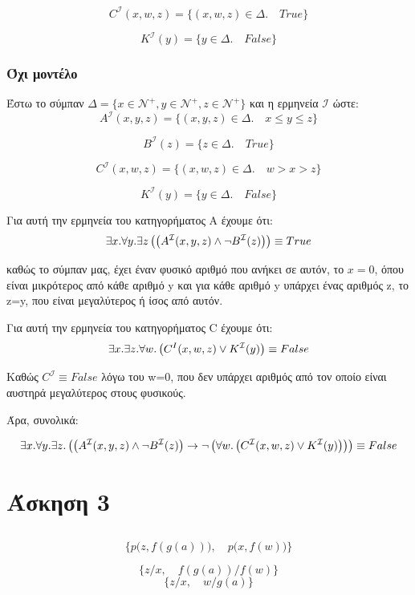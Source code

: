 \documentclass[a4paper,oneside, 11pt]{article}
\newcommand*{\im}{\ensuremath{\to}}
\newcommand*{\ex}{\ensuremath{\exists}}
\newcommand*{\f}{\ensuremath{\forall}}
\newcommand*{\p}{\ensuremath{\left(}}
\newcommand*{\pp}{\ensuremath{\right)}}
\newcommand*{\ww}{\ensuremath{\wedge}}
\newcommand*{\vv}{\ensuremath{\vee}}
\newcommand*{\eq}{\ensuremath{\equiv}}
\begin{document}
$$C^\mathcal I(x,w,z) = \{(x,w,z) \in \Delta . \quad  True \}$$


$$
K ^ \mathcal I(y) = \{ y \in \Delta. \quad False\}
$$

\subsubsection{Όχι μοντέλο}
Έστω το σύμπαν $\Delta = \{x\in \mathcal{N}^+,y\in \mathcal N^+,z \in \mathcal{N}^+ \}$ και η ερμηνεία $\mathcal I$ ώστε: $$A^\mathcal I(x,y,z) = \{(x,y,z) \in \Delta . \quad  x \leq y \leq z\}$$

$$
B ^ \mathcal I(z) = \{ z \in \Delta. \quad True\}
$$

$$C^\mathcal I(x,w,z) = \{(x,w,z) \in \Delta . \quad  w > x > z\}$$

$$
K ^ \mathcal I(y) = \{ y \in \Delta. \quad False\}
$$

Για αυτή την ερμηνεία του κατηγορήματος Α έχουμε ότι:
$$\ex x. \f y. \ex z \p \p A^\mathcal I (x, y, z) \ww \neg B^\mathcal I(z)\pp \pp \eq True$$

καθώς το σύμπαν μας, έχει έναν φυσικό αριθμό που ανήκει σε αυτόν, το $x = 0$, όπου είναι μικρότερος από κάθε αριθμό y και για κάθε αριθμό y υπάρχει ένας αριθμός z, το z=y, που είναι μεγαλύτερος ή ίσος από αυτόν. \bigbreak 

Για αυτή την ερμηνεία του κατηγορήματος C έχουμε ότι:
$$\ex x. \ex z. \f w. \p C^ I(x, w, z) \vv K^\mathcal I(y)\pp \equiv False$$

Καθώς $C^\mathcal I \equiv False$ λόγω του w=0, που δεν υπάρχει αριθμός από τον οποίο είναι αυστηρά μεγαλύτερος στους φυσικούς. 

Άρα, συνολικά:


$$
\ex x. \f y. \ex z. \p \p A^\mathcal I(x,y,z) \ww \neg B^\mathcal I(z) \pp \im \neg \p \f w. \p C^\mathcal I(x, w, z) \vv K^\mathcal I(y) \pp \pp \pp \eq False
$$

\section{Άσκηση 3}

\subsection{}

$$\{p\big(z, f(g(a))\big), \quad p\big(x, f(w)\big) \}$$

$$\{ z/x, \quad f(g(a)) / f(w) \}$$
$$\boxed{ \{z/x, \quad w/g(a)\}}$$
\end{document}
